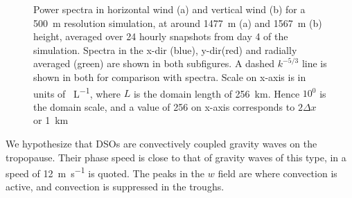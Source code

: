 \documentclass[11pt,a4paper]{article}
\begin{document}
\begin{figure}[htb!]%
    \centering
    \qquad
    \caption{Power spectra in horizontal wind (a) and vertical wind (b) for a \SI{500}{m} resolution simulation, at around \SI{1477}{m} (a) and \SI{1567}{m} (b) height, averaged over 24 hourly snapshots from day 4 of the simulation. Spectra in the x-dir (blue), y-dir(red) and radially averaged (green) are shown in both subfigures. A dashed $k^{-5/3}$ line is shown in both for comparison with spectra. Scale on x-axis is in units of \SI{}{L^{-1}}, where $L$ is the domain length of \SI{256}{km}. Hence $10^0$ is the domain scale, and a value of 256 on x-axis corresponds to $2 \Delta x$ or \SI{1}{km}}%
    \label{fig:power_spectra}%
\end{figure}

We hypothesize that DSOs are convectively coupled gravity waves on the tropopause. Their phase speed is close to that of gravity waves of this type, in \cite{gill1982atmosphere} a speed of \SI{12}{m.s^{-1}} is quoted. The peaks in the $w$ field are where convection is active, and convection is suppressed in the troughs. 
\end{document}
